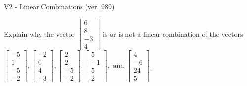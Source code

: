 \begin{exercise}
  \begin{exerciseTitle}V2 - Linear Combinations (ver. 989)\end{exerciseTitle}
  \begin{exerciseStatement}
    Explain why the vector \(\left[\begin{array}{c}
6 \\
8 \\
-3 \\
4
\end{array}\right]\)  is or is not a linear 
	combination of the vectors \(\left[\begin{array}{c}
-5 \\
1 \\
-5 \\
-2
\end{array}\right] , \left[\begin{array}{c}
-2 \\
0 \\
4 \\
-3
\end{array}\right] , \left[\begin{array}{c}
2 \\
2 \\
-5 \\
-2
\end{array}\right] , \left[\begin{array}{c}
5 \\
-1 \\
5 \\
2
\end{array}\right] , \text{ and } \left[\begin{array}{c}
4 \\
-6 \\
24 \\
5
\end{array}\right]\).
	



\end{exerciseStatement}
\end{exercise}
